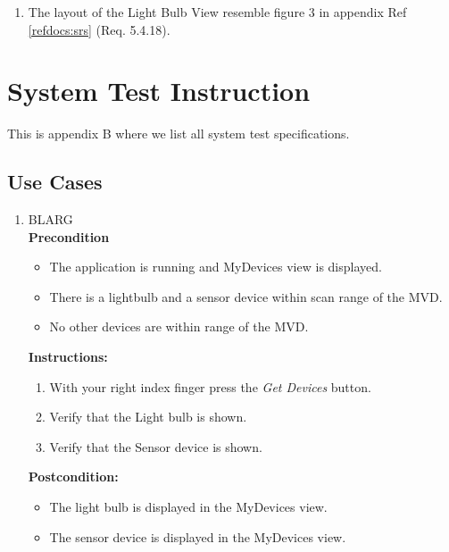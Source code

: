 \documentclass[a4paper]{article}
\newlength{\testlabellength}
\newenvironment{testlist}{\begin{enumerate}[label=\bfseries Instruction \thesubsection.\arabic* , labelindent=0pt, labelwidth=\testlabellength , leftmargin=2cm]}{\end{enumerate}}
\newenvironment{precondition}{
{\color{white}BLARG}\\ 
\textbf{Precondition}
\begin{itemize}[labelindent=0cm, labelwidth=2cm , leftmargin=1cm]
}
{\end{itemize}}
\newenvironment{instruction}{
\textbf{Instructions:}
\begin{enumerate}[label=\bfseries  \arabic*., labelindent=0cm, labelwidth=2cm , leftmargin=1cm]
}
{\end{enumerate}}
\newenvironment{postcondition}{
\textbf{Postcondition:}
\begin{itemize}[labelindent=0cm, labelwidth=2cm , leftmargin=1cm]
}
{\end{itemize}}
\begin{document}
\begin{appendices}
\begin{testlist}
    \item The layout of the Light Bulb View resemble figure 3 in appendix  Ref \ref{refdocs:srs} (Req. 5.4.18).

\end{testlist}	

\newpage

\section{System Test Instruction} \label{appendix:section:systemtest}
This is appendix B where we list all system test specifications.

\subsection{Use Cases}
\begin{testlist}
	\item 
		\begin{precondition}
			\item The application is running and MyDevices view is displayed.
			\item There is a lightbulb and a sensor device within scan range of the MVD.
			\item No other devices are within range of the MVD.
		\end{precondition}
		\begin{instruction}
			\item With your right index finger press the \emph{Get Devices} button.
			\item Verify that the Light bulb is shown.
			\item Verify that the Sensor device is shown.
		\end{instruction}
		\begin{postcondition}
			\item The light bulb is displayed in the MyDevices view.
		 	\item The sensor device is displayed in the MyDevices view.
		\end{postcondition}


\end{testlist}
\end{appendices}
\end{document}
